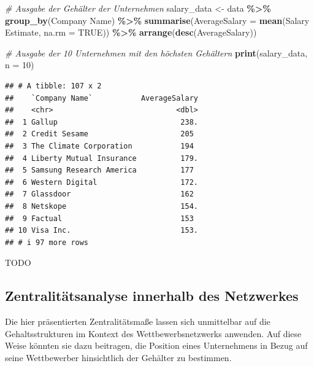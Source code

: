 \documentclass[
]{article}
\newenvironment{Shaded}{\begin{snugshade}}{\end{snugshade}}
\newcommand{\AttributeTok}[1]{\textcolor[rgb]{0.13,0.29,0.53}{#1}}
\newcommand{\CommentTok}[1]{\textcolor[rgb]{0.56,0.35,0.01}{\textit{#1}}}
\newcommand{\ConstantTok}[1]{\textcolor[rgb]{0.56,0.35,0.01}{#1}}
\newcommand{\DecValTok}[1]{\textcolor[rgb]{0.00,0.00,0.81}{#1}}
\newcommand{\FunctionTok}[1]{\textcolor[rgb]{0.13,0.29,0.53}{\textbf{#1}}}
\newcommand{\NormalTok}[1]{#1}
\newcommand{\OtherTok}[1]{\textcolor[rgb]{0.56,0.35,0.01}{#1}}
\newcommand{\SpecialCharTok}[1]{\textcolor[rgb]{0.81,0.36,0.00}{\textbf{#1}}}
\newcommand{\StringTok}[1]{\textcolor[rgb]{0.31,0.60,0.02}{#1}}
\begin{document}
\begin{Shaded}
\begin{Highlighting}[]
\CommentTok{\# Ausgabe der Gehälter der Unternehmen}
\NormalTok{salary\_data }\OtherTok{\textless{}{-}}\NormalTok{ data }\SpecialCharTok{\%\textgreater{}\%}
  \FunctionTok{group\_by}\NormalTok{(}\StringTok{\textasciigrave{}}\AttributeTok{Company Name}\StringTok{\textasciigrave{}}\NormalTok{) }\SpecialCharTok{\%\textgreater{}\%}
  \FunctionTok{summarise}\NormalTok{(}\AttributeTok{AverageSalary =} \FunctionTok{mean}\NormalTok{(}\StringTok{\textasciigrave{}}\AttributeTok{Salary Estimate}\StringTok{\textasciigrave{}}\NormalTok{, }\AttributeTok{na.rm =} \ConstantTok{TRUE}\NormalTok{)) }\SpecialCharTok{\%\textgreater{}\%}
  \FunctionTok{arrange}\NormalTok{(}\FunctionTok{desc}\NormalTok{(AverageSalary))}

\CommentTok{\# Ausgabe der 10 Unternehmen mit den höchsten Gehältern}
\FunctionTok{print}\NormalTok{(salary\_data, }\AttributeTok{n =} \DecValTok{10}\NormalTok{)}
\end{Highlighting}
\end{Shaded}

\begin{verbatim}
## # A tibble: 107 x 2
##    `Company Name`           AverageSalary
##    <chr>                            <dbl>
##  1 Gallup                            238.
##  2 Credit Sesame                     205 
##  3 The Climate Corporation           194 
##  4 Liberty Mutual Insurance          179.
##  5 Samsung Research America          177 
##  6 Western Digital                   172.
##  7 Glassdoor                         162 
##  8 Netskope                          154.
##  9 Factual                           153 
## 10 Visa Inc.                         153.
## # i 97 more rows
\end{verbatim}

TODO

\subsection{Zentralitätsanalyse innerhalb des
Netzwerkes}\label{zentralituxe4tsanalyse-innerhalb-des-netzwerkes}

Die hier präsentierten Zentralitätsmaße lassen sich unmittelbar auf die
Gehaltsstrukturen im Kontext des Wettbewerbsnetzwerks anwenden. Auf
diese Weise könnten sie dazu beitragen, die Position eines Unternehmens
in Bezug auf seine Wettbewerber hinsichtlich der Gehälter zu bestimmen.
\end{document}
